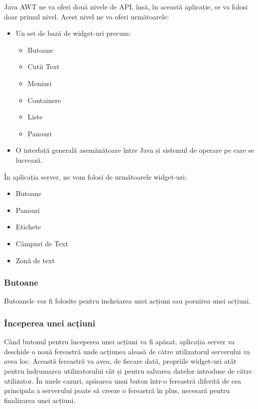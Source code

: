 \documentclass{article}
\begin{document}
		  Java AWT ne va oferi două nivele de API, însă, în această aplicație, se va folosi doar primul nivel. Acest nivel ne va oferi următoarele:
	\begin{itemize}
		\item Un set de bază de widget-uri precum:
			\begin{itemize}
				\item Butoane
				\item Cutii Text
				\item Meniuri
				\item Containere
				\item Liste
				\item Panouri
			\end{itemize}
		\item O interfață generală asemănătoare între Java și sistemul de operare pe care se lucrează. 
	\end{itemize}

	În aplicația server, ne vom folosi de următoarele widget-uri:
	\begin{itemize}
		\item{Butoane}
		\item{Panouri}
		\item{Etichete}
		\item{Câmpuri de Text}
		\item{Zonă de text}
	\end{itemize}

	 \subsubsection{Butoane}

	Butoanele vor fi folosite pentru incheiarea unei acțiuni sau pornirea unei acțiuni. 
\subsubsection*{Începerea unei acțiuni}

	Când butonul pentru începerea unei acțiuni va fi apăsat, aplicația server va deschide o nouă fereastră unde acțiunea aleasă de către utilizatorul serverului va avea loc. Această fereastră va avea, de fiecare dată, propriile widget-uri atât pentru îndrumarea utilizatorului cât și pentru salvarea datelor introduse de către utilizator. În unele cazuri, apăsarea unui buton într-o fereastră diferită de cea principala a serverului poate să creeze o fereastră în plus, necesară pentru finalizarea unei acțiuni.\\
\end{document}
